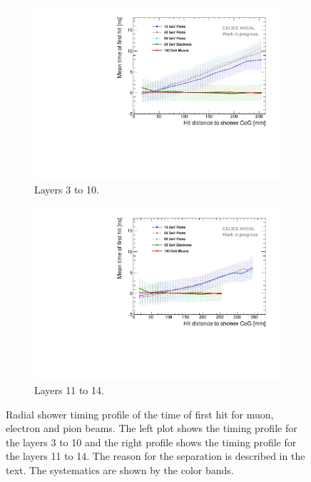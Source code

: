 \begin{figure}[htbp!]
	\begin{subfigure}[t]{0.5\textwidth}
		\centering
		\includegraphics[width=1\textwidth]{../Thesis_Plots/Timing/Pions/Plots/Timing_Radius_Comparison_ShortAsymRange_SSF.pdf}
		\caption{Layers 3 to 10.}\label{fig:Radius_Comparison_SSF}
	\end{subfigure}
	\hfill
	\begin{subfigure}[t]{0.5\textwidth}
		\centering
		\includegraphics[width=1\textwidth]{../Thesis_Plots/Timing/Pions/Plots/Timing_Radius_Comparison_ShortAsymRange_BL.pdf}
		\caption{Layers 11 to 14.}\label{fig:Radius_Comparison_BL}
	\end{subfigure}
	\caption{Radial shower timing profile of the time of first hit for muon, electron and pion beams. The left plot shows the timing profile for the layers 3 to 10 and the right profile shows the timing profile for the layers 11 to 14. The reason for the separation is described in the text. The systematics are shown by the color bands.}
	\label{fig:RadialTiming}
\end{figure}

